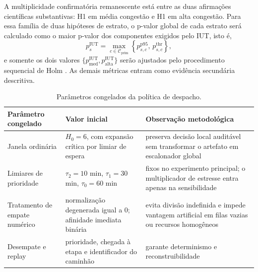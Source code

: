 \documentclass[
  12pt,
  oneside,
  a4paper,
  sumario=tradicional,
  brazil
]{abntex2}
\begin{document}
A multiplicidade confirmat\'oria remanescente est\'a entre as duas afirma\c{c}\~oes cient\'ificas substantivas: H1 em m\'edia congest\~ao e H1 em alta congest\~ao. Para essa fam\'ilia de duas hip\'oteses de estrato, o p-valor global de cada estrato ser\'a calculado como o maior p-valor dos componentes exigidos pelo IUT, isto \'e,
\[
p^{\mathrm{IUT}}_{s}=\max_{c \in \mathcal{C}_{\mathrm{prim}}}\left\{p^{\mathrm{p95}}_{s,c},\,p^{\mathrm{thr}}_{s,c}\right\},
\]
e somente os dois valores $\{p^{\mathrm{IUT}}_{\mathrm{med}}, p^{\mathrm{IUT}}_{\mathrm{alta}}\}$ ser\~ao ajustados pelo procedimento sequencial de Holm \parencite{holmSimpleSequentiallyRejective1979}. As demais m\'etricas entram como evid\^encia secund\'aria descritiva.

\begin{table}[H]
\centering
\small
\setlength{\tabcolsep}{6pt}
\renewcommand{\arraystretch}{1.15}
\begin{tabularx}{\textwidth}{@{}P{0.27\textwidth}P{0.25\textwidth}Y@{}}
\toprule
{}
\textbf{Par\^ametro congelado} & \textbf{Valor inicial} & \textbf{Observa\c{c}\~ao metodol\'ogica} \\
\midrule
Janela ordin\'aria & $H_0=6$, com expans\~ao cr\'itica por limiar de espera & preserva decis\~ao local audit\'avel sem transformar o artefato em escalonador global \\
\addlinespace
Limiares de prioridade & $\tau_2=10$ min, $\tau_1=30$ min, $\tau_0=60$ min & fixos no experimento principal; o multiplicador de estresse entra apenas na sensibilidade \\
\addlinespace
Tratamento de empate num\'erico & normaliza\c{c}\~ao degenerada igual a 0; afinidade imediata bin\'aria & evita divis\~ao indefinida e impede vantagem artificial em filas vazias ou recursos homog\^eneos \\
\addlinespace
Desempate e replay & prioridade, chegada \`a etapa e identificador do caminh\~ao & garante determinismo e reconstruibilidade \\
\bottomrule
\end{tabularx}
\caption[Par\^ametros da pol\'itica de despacho]{Par\^ametros congelados da pol\'itica de despacho.}
\label{tab:parametros-politica}
\end{table}
\end{document}
